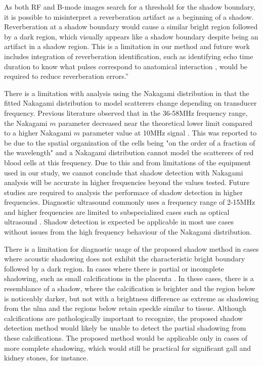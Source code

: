 \documentclass[authoryear,preprint,review,12pt]{elsarticle}
\begin{document}
As both RF and B-mode images search for a threshold for the shadow boundary, it is possible to misinterpret a reverberation artifact as a beginning of a shadow. Reverberation at a shadow boundary would cause a similar bright region followed by a dark region, which visually appears like a shadow boundary despite being an artifact in a shadow region. This is a limitation in our method and future work includes integration of reverberation identification, such as identifying echo time duration to know what pulses correspond to anatomical interaction \citep{Win2010}, would be required to reduce reverberation errors.”

There is a limitation with analysis using the Nakagami distribution in that the fitted Nakagami distribution to model scatterers change depending on transducer frequency. Previous literature observed that in the 36-58MHz frequency range, the Nakagami $m$ parameter decreased near the theoretical lower limit compared to a higher Nakagami $m$ parameter value at 10MHz signal \citep{Cloutier2004}. This was reported to be due to the spatial organization of the cells being "on the order of a fraction of the wavelength" and a Nakagami distribution cannot model the scatterers of red blood cells at this frequency. Due to this and from limitations of the equipment used in our study, we cannot conclude that shadow detection with Nakagami analysis will be accurate in higher frequencies beyond the values tested. Future studies are required to analysis the performace of shadow detection in higher frequencies. Diagnostic ultrasound commonly uses a frequency range of 2-15MHz \citep{Jensen2007} and higher frequencies are limited to subspecialized cases such as optical ultrasound \citep{Pavlin1992}. Shadow detection is expected be applicable in most use cases without issues from the high frequency behaviour of the Nakagami distribution.

There is a limitation for diagnostic usage of the proposed shadow method in cases where acoustic shadowing does not exhibit the characteristic bright boundary followed by a dark region. In cases where there is partial or incomplete shadowing, such as small calcifications in the placenta \citep{Abramowicz2008}. In these cases, there is a resemblance of a shadow, where the calcification is brighter and the region below is noticeably darker, but not with a brightness difference as extreme as shadowing from the ulna and the regions below retain speckle similar to tissue. Although calcifications are pathologically important to recognize, the proposed shadow detection method would likely be unable to detect the partial shadowing from these calcifications. The proposed method would be applicable only in cases of more complete shadowing, which would still be practical for significant gall and kidney stones, for instance.
\end{document}

